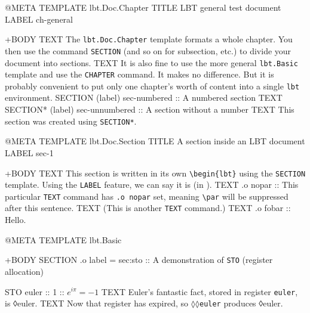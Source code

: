 \documentclass[a4paper,oneside,11pt]{memoir}
\begin{document}
\lbtDraftModeOff{}

\tableofcontents



\begin{lbt}
  @META
    TEMPLATE   lbt.Doc.Chapter
    TITLE      LBT general test document
    LABEL      ch-general

  +BODY
    TEXT The \texttt{lbt.Doc.Chapter} template formats a whole chapter. You then use the command \texttt{SECTION} (and so on for subsection, etc.) to divide your document into sections.
    TEXT It is also fine to use the more general \texttt{lbt.Basic} template and use the \texttt{CHAPTER} command. It makes no difference. But it is probably convenient to put only one chapter's worth of content into a single \texttt{lbt} environment.
    SECTION (label) sec-numbered :: A numbered section
    TEXT \kant[3]
    SECTION* (label) sec-unnumbered :: A section without a number
    TEXT This section was created using \texttt{SECTION*}.
\end{lbt}

\begin{lbt}
  @META
    TEMPLATE   lbt.Doc.Section
    TITLE      A section inside an LBT document
    LABEL      sec-1

  +BODY
    TEXT This section is written in its own \verb|\begin{lbt}| using the \texttt{SECTION} template. Using the \texttt{LABEL} feature, we can say it is  (in ).
    TEXT .o nopar :: This particular \texttt{TEXT} command has \texttt{.o nopar} set, meaning \verb|\par| will be suppressed after this sentence.
    TEXT (This is another \texttt{TEXT} command.)
    TEXT .o fobar :: Hello.
\end{lbt}

\begin{lbt}
  @META
    TEMPLATE lbt.Basic

  +BODY
    SECTION .o label = sec:sto :: A demonstration of \texttt{STO} (register allocation)

    STO euler :: 1 :: $e^{i\pi} = -1$
    TEXT Euler's fantastic fact, stored in register \texttt{euler}, is ◊euler.
    TEXT Now that register has expired, so \texttt{◊◊euler} produces ◊euler.
    
\end{lbt}
\end{document}
